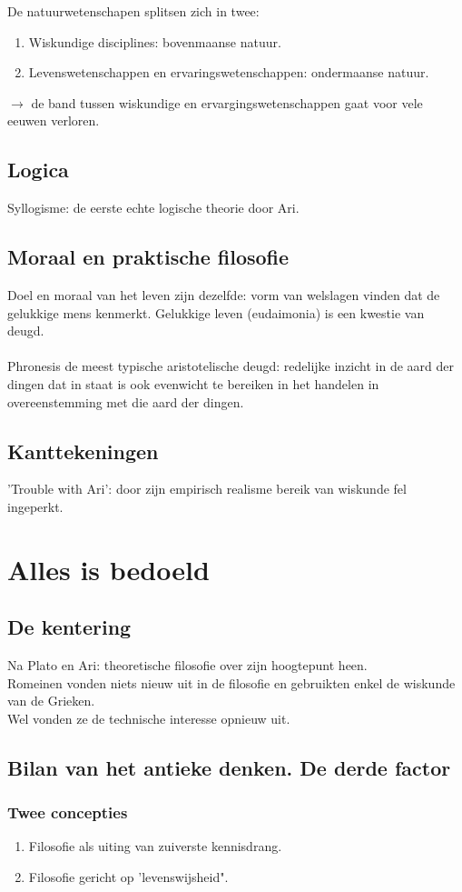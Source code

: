 \documentclass[11pt,a4paper]{article}
\begin{document}
De natuurwetenschapen splitsen zich in twee:
\begin{enumerate}
\item Wiskundige disciplines: bovenmaanse natuur.
\item Levenswetenschappen en ervaringswetenschappen: ondermaanse natuur.
\end{enumerate}
$\rightarrow$ de band tussen wiskundige en ervargingswetenschappen gaat voor vele eeuwen verloren.
\subsection{Logica}
Syllogisme: de eerste echte logische theorie door Ari.
\subsection{Moraal en praktische filosofie}
Doel en moraal van het leven zijn dezelfde: vorm van welslagen vinden dat de gelukkige mens kenmerkt. Gelukkige leven (eudaimonia) is een kwestie van deugd.
\\
\\
Phronesis de meest typische aristotelische deugd: redelijke inzicht in de aard der dingen dat in staat is ook evenwicht te bereiken in het handelen in overeenstemming met die aard der dingen.
\subsection{Kanttekeningen}
'Trouble with Ari': door zijn empirisch realisme bereik van wiskunde fel ingeperkt.
\section{Alles is bedoeld}
\subsection{De kentering}
Na Plato en Ari: theoretische filosofie over zijn hoogtepunt heen.
\\
Romeinen vonden niets nieuw uit in de filosofie en gebruikten enkel de wiskunde van de Grieken. 
\\
Wel vonden ze de technische interesse opnieuw uit.
\subsection{Bilan van het antieke denken. De derde factor}
\subsubsection{Twee concepties}
\begin{enumerate}
\item Filosofie als uiting van zuiverste kennisdrang.
\item Filosofie gericht op 'levenswijsheid".
\end{enumerate}
\end{document}
